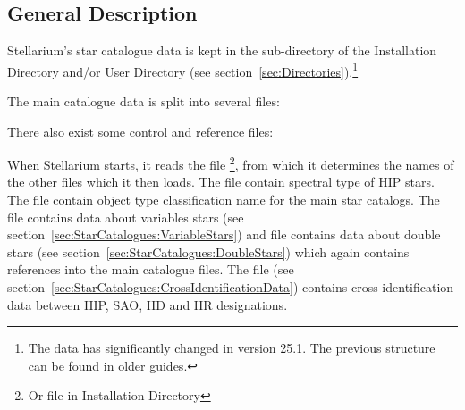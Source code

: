 \subsection{General Description}%
\label{sec:Catalogues:stars:general}

Stellarium's star catalogue data is kept in the 
sub-directory of the Installation Directory and/or User Directory (see
section~\ref{sec:Directories}).\footnote{The data has significantly changed in version 25.1. The previous structure can be found in older guides.}

The main catalogue data is split into several files:

\begin{description}
\item[]
\item[]
\item[]
\item[]
\item[]
\item[]
\item[]
\item[]
\item[]
\end{description}

There also exist some control and reference files:

\begin{description}
\item[]
\item[]
\item[]
\item[]
\item[]
\item[]
\item[]
\end{description}

When Stellarium starts, it reads the file %
\footnote{Or  file in Installation Directory}, from which it determines the 
names of the other files which it then loads. The file  
contain spectral type of HIP stars. The file  
contain object type classification name for the main star catalogs. 
The file  contains data about variables stars
(see section~\ref{sec:StarCatalogues:VariableStars}) and file  
contains data about double stars (see section~\ref{sec:StarCatalogues:DoubleStars}) 
which again contains references into the main catalogue files.
The file  (see section~\ref{sec:StarCatalogues:CrossIdentificationData}) contains cross-identification data between HIP, SAO, HD and HR designations.

